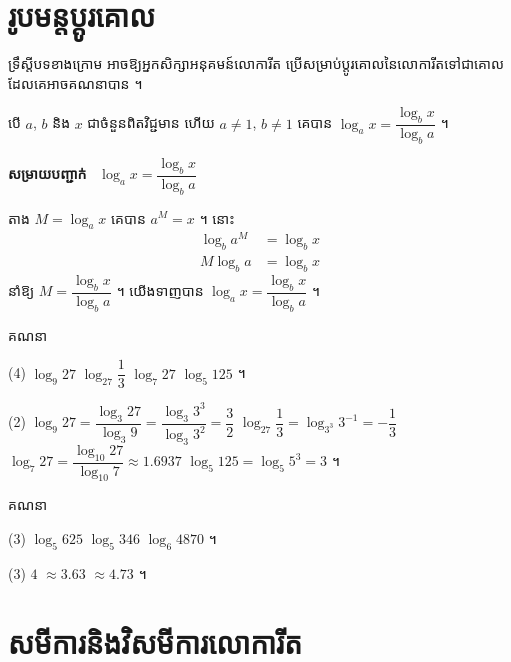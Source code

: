 \section{រូបមន្តប្តូរគោល}

ទ្រឹស្តីបទខាងក្រោម អាចឱ្យអ្នកសិក្សាអនុគមន៍លោការីត ប្រើសម្រាប់ប្តូរគោលនៃលោការីតទៅជាគោលដែលគេអាចគណនាបាន ។

\begin{theorem}[រូបមន្តប្តូរគោល]
បើ $a$, $b$ និង $x$ ជាចំនួនពិតវិជ្ជមាន ហើយ $a \ne 1$, $b \ne 1$ គេបាន $\log_a x = \dfrac{\log_b x}{\log_b a}$ ។
\end{theorem}

\textbf{សម្រាយបញ្ជាក់} \ $\log_a x = \dfrac{\log_b x}{\log_b a}$

តាង $M = \log_a x$ គេបាន $a^M = x$ ។ នោះ
\[
\begin{aligned}
\log_b a^M &= \log_b x\\
M\log_b a &= \log_b x
\end{aligned}
\]
នាំឱ្យ $M = \dfrac{\log_b x}{\log_b a}$ ។ យើងទាញបាន $\log_a x = \dfrac{\log_b x}{\log_b a}$ ។

\begin{example}[លំហាត់គំរូ ២]
គណនា
\begin{tasks}(4)
  \task $\log_9 27$
  \task $\log_{27} \dfrac{1}{3}$
  \task $\log_7 27$
  \task $\log_5 125$ ។
\end{tasks}
\end{example}
\ans
\begin{tasks}(2)
  \task $\log_9 27 = \dfrac{\log_3 27}{\log_3 9} = \dfrac{\log_3 3^3}{\log_3 3^2} = \dfrac{3}{2}$
  \task $\log_{27} \dfrac{1}{3} = \log_{3^3} 3^{-1} = -\dfrac{1}{3}$
  \task $\log_7 27 = \dfrac{\log_{10} 27}{\log_{10} 7} \approx 1.6937$
  \task $\log_5 125 = \log_5 5^3 = 3$ ។
\end{tasks}

\begin{pro}
គណនា
\begin{tasks}(3)
  \task $\log_5 625$
  \task $\log_5 346$
  \task $\log_6 4870$ ។
\end{tasks}
\ans
\begin{tasks}(3)
  \task $4$
  \task $\approx 3.63$
  \task $\approx 4.73$ ។
\end{tasks}
\end{pro}

\section{សមីការនិងវិសមីការលោការីត}

